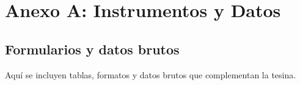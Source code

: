 \chapter{Anexo A: Instrumentos y Datos}
\section{Formularios y datos brutos}
Aquí se incluyen tablas, formatos y datos brutos que complementan la tesina.
